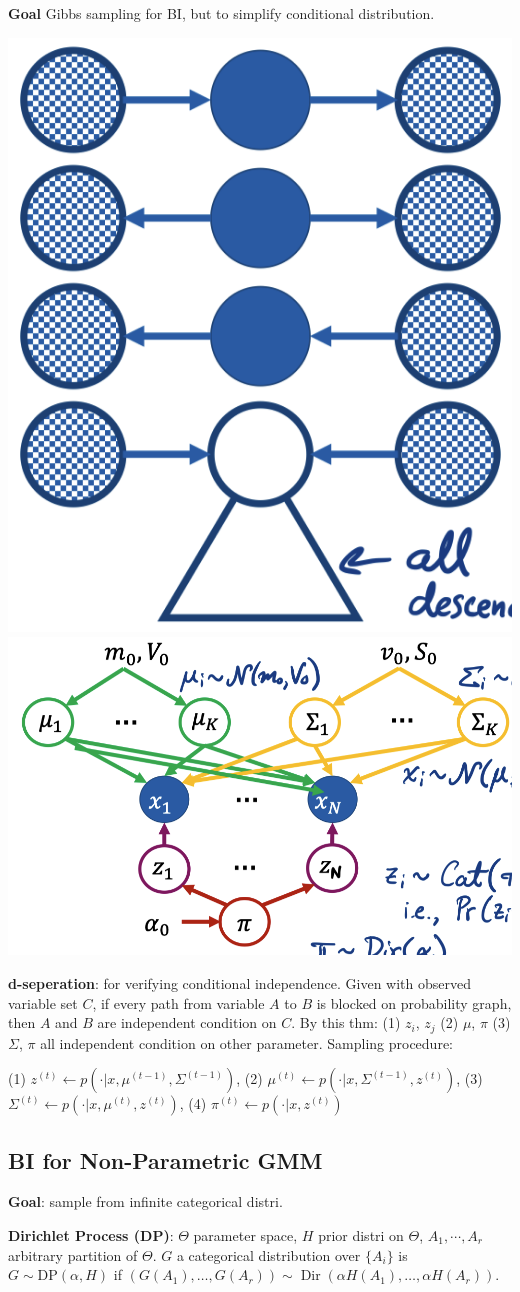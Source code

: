 \textbf{Goal} Gibbs sampling for BI, but to simplify conditional distribution.
\begin{center}
    \includegraphics[width=0.3\columnwidth]{figures/d-sep.png}
    \includegraphics[width=0.50\columnwidth]{figures/GMM.png}
\end{center}

\textbf{d-seperation}: for verifying conditional independence. Given with observed variable set $C$, if every path from variable $A$ to $B$ is blocked on probability graph, then $A$ and $B$ are independent condition on $C$. By this thm: (1) $z_i$, $z_j$ (2) $\mu$, $\pi$  (3) $\Sigma$, $\pi$ all independent condition on other parameter. Sampling procedure: \begin{scriptsize}
    (1) $z^{(t)} \leftarrow p\left(\cdot | x, \mu^{(t-1)}, \Sigma^{(t-1)}\right)$, (2) $\mu^{(t)} \leftarrow p\left(\cdot | x, \Sigma^{(t-1)}, z^{(t)}\right)$, (3) $\Sigma^{(t)} \leftarrow p\left(\cdot | x, \mu^{(t)}, z^{(t)}\right)$, (4) $\pi^{(t)} \leftarrow p\left(\cdot | x, z^{(t)}\right)$
\end{scriptsize}

\subsection*{BI for Non-Parametric GMM}
\textbf{Goal}: sample from infinite categorical distri.

\textbf{Dirichlet Process (DP)}: $\Theta$ parameter space, $H$ prior distri on $\Theta$, $A_1, \cdots, A_r$ arbitrary partition of $\Theta$. $G$ a categorical distribution over $\{A_i\}$ is  $G \sim \mathrm{DP}(\alpha, H)$ if $\left(G\left(A_{1}\right), \ldots, G\left(A_{r}\right)\right) \sim \operatorname{Dir}\left(\alpha H\left(A_{1}\right), \ldots, \alpha H\left(A_{r}\right)\right)$.

